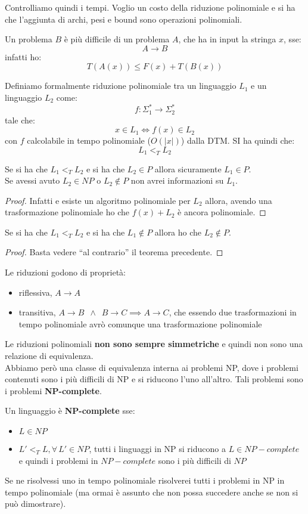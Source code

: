 Controlliamo quindi i tempi. Voglio un costo della riduzione polinomiale e si ha
che l'aggiunta di archi, pesi e bound sono operazioni polinomiali.
\begin{definizione}
  Un problema $B$ è più difficile di un problema $A$, che ha in input la stringa
  $x$, sse:
  \[A\to B\]
  infatti ho:
  \[T(A(x))\leq F(x)+T(B(x))\]
\end{definizione}
\begin{definizione}
  Definiamo formalmente riduzione polinomiale tra un linguaggio $L_1$ e un
  linguaggio $L_2$ come:
  \[f:\Sigma_1^*\to \Sigma_2^*\]
  tale che:
  \[x\in L_1\iff f(x)\in L_2\]
  con $f$ calcolabile in tempo polinomiale ($O(|x|)$) dalla DTM. SI ha quindi
  che:
  \[L_1<_T L_2\]
\end{definizione}
\begin{teorema}
  Se si ha che $L_1<_T L_2$ e si ha che $L_2\in P$ allora sicuramente $L_1\in
  P$.\\
  Se avessi avuto $L_2\in NP$ o $L_2\not\in P$ non avrei informazioni su $L_1$. 

\end{teorema}
\begin{proof}
  Infatti e esiste un algoritmo polinomiale per $L_2$ allora, avendo una
  trasformazione polinomiale  ho che $f(x)+L_2$ è ancora polinomiale.
\end{proof}
\begin{teorema}
  Se si ha che $L_1<_T L_2$ e si ha che $L_1\not\in P$ allora ho che
  $L_2\not\in P$.
\end{teorema}
\begin{proof}
  Basta vedere ``al contrario'' il teorema precedente.
\end{proof}
Le riduzioni godono di proprietà:
\begin{itemize}
  \item riflessiva, $A\to A$
  \item transitiva, $A\to B\,\,\,\land \,\,\,B\to C\implies A\to C$, che essendo
  due trasformazioni in tempo polinomiale avrò comunque una trasformazione
  polinomiale 
\end{itemize}
Le riduzioni polinomiali \textbf{non sono sempre simmetriche} e quindi non sono
una relazione di equivalenza.\\
Abbiamo però una classe di equivalenza interna ai problemi NP, dove i problemi
contenuti sono i più difficili di NP e si riducono l'uno all'altro. Tali
problemi sono i problemi \textbf{NP-complete}.
\begin{definizione}
  Un linguaggio è \textbf{NP-complete} sse:
  \begin{itemize}
    \item $L\in NP$
    \item $L'<_TL,\forall\,L'\in NP$, tutti i linguaggi in NP si riducono a
    $L\in NP-complete$ e quindi i problemi in $NP-complete$ sono i più difficili
    di $NP$
  \end{itemize}
  Se ne risolvessi uno in tempo polinomiale risolverei tutti i problemi in NP in
  tempo polinomiale (ma ormai è assunto che non possa succedere anche se non si
  può dimostrare).
\end{definizione}
